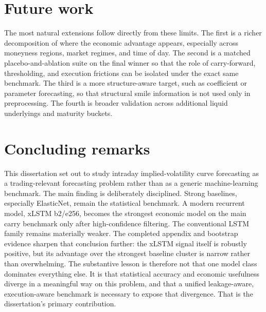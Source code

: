 \documentclass[12pt]{report}
\begin{document}
\section{Future work}
The most natural extensions follow directly from these limits. The first is a richer decomposition of where the economic advantage appears, especially across moneyness regions, market regimes, and time of day. The second is a matched placebo-and-ablation suite on the final winner so that the role of carry-forward, thresholding, and execution frictions can be isolated under the exact same benchmark. The third is a more structure-aware target, such as coefficient or parameter forecasting, so that structural smile information is not used only in preprocessing. The fourth is broader validation across additional liquid underlyings and maturity buckets.

\section*{Concluding remarks}
This dissertation set out to study intraday implied-volatility curve forecasting as a trading-relevant forecasting problem rather than as a generic machine-learning benchmark. The main finding is deliberately disciplined. Strong baselines, especially ElasticNet, remain the statistical benchmark. A modern recurrent model, xLSTM b2/e256, becomes the strongest economic model on the main carry benchmark only after high-confidence filtering. The conventional LSTM family remains materially weaker. The completed appendix and bootstrap evidence sharpen that conclusion further: the xLSTM signal itself is robustly positive, but its advantage over the strongest baseline cluster is narrow rather than overwhelming. The substantive lesson is therefore not that one model class dominates everything else. It is that statistical accuracy and economic usefulness diverge in a meaningful way on this problem, and that a unified leakage-aware, execution-aware benchmark is necessary to expose that divergence. That is the dissertation's primary contribution.
\end{document}
